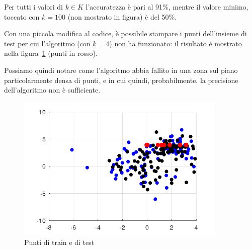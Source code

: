\documentclass[a4paper]{article}
\begin{document}
Per tutti i valori di $k\in K$ l'accuratezza è pari al 91\%, mentre il valore minimo, toccato con $k=100$ (non mostrato in figura) è del 50\%.

Con una piccola modifica al codice, è possibile stampare i punti dell'insieme di test per cui l'algoritmo (con $k=4$) non ha funzionato: il risultato è mostrato nella figura~\ref{fig:sb} (punti in rosso).

Possiamo quindi notare come l'algoritmo abbia fallito in una zona sul piano particolarmente densa di punti, e in cui quindi, probabilmente, la precisione dell'algoritmo non è sufficiente.

\begin{figure}
\centering
\includegraphics[width=10cm]{puntisb}
\caption{Punti di train e di test}
\label{fig:sb}
\end{figure}
\end{document}
